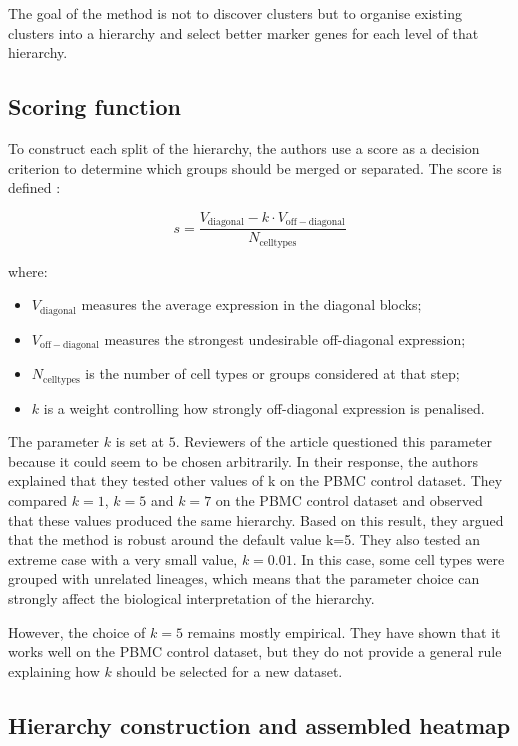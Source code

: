 \documentclass[11pt,a4paper]{article}
\begin{document}
The goal of the method is not to discover clusters but to organise existing clusters into a hierarchy and select better marker genes for each level of that hierarchy. 

\subsection{Scoring function} 

To construct each split of the hierarchy, the authors use a score as a decision criterion to determine which groups should be merged or separated. The score is defined :

\[
 s = \frac{V_{\mathrm{diagonal}} - k \cdot V_{\mathrm{off-diagonal}}}{N_{\mathrm{celltypes}}}
\]

where:

\begin{itemize}[leftmargin=1.5em]
    \item $V_{\mathrm{diagonal}}$ measures the average expression in the diagonal blocks;
    \item $V_{\mathrm{off-diagonal}}$ measures the strongest undesirable off-diagonal expression;
    \item $N_{\mathrm{celltypes}}$ is the number of cell types or groups considered at that step;
    \item $k$ is a weight controlling how strongly off-diagonal expression is penalised.
\end{itemize}

The parameter $k$ is set at $5$. Reviewers of the article questioned this parameter because it could seem to be chosen arbitrarily.
In their response, the authors explained that they tested other values of k on the PBMC control dataset.
They compared $k=1$, $k=5$ and $k=7$ on the PBMC control dataset and observed that these values produced the same hierarchy.
Based on this result, they argued that the method is robust around the default value k=5.
They also tested an extreme case with a very small value, $k=0.01$.
In this case, some cell types were grouped with unrelated lineages, which means that the parameter choice can strongly affect the biological interpretation of the hierarchy.

However, the choice of $k=5$ remains mostly empirical.
They have shown that it works well on the PBMC control dataset, but they do not provide a general rule explaining how $k$ should be selected for a new dataset. 


\subsection{Hierarchy construction and assembled heatmap}
\end{document}

